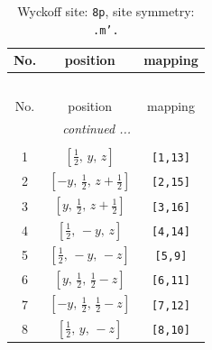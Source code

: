 \documentclass[fleqn,8pt]{jsarticle}
\begin{document}
\begin{longtable}{ccc}
\caption{Wyckoff site: {\tt 8p}, site symmetry: {\tt .m'.}}
 \\
 \hline \hline
No. & position & mapping \\ \hline \endfirsthead

\multicolumn{2}{l}{\tablename\ \thetable{}} \\
 \hline \hline
No. & position & mapping \\ \hline \endhead

 \hline \hline
\multicolumn{2}{r}{\footnotesize\it continued ...} \\ \endfoot

 \hline \hline
\multicolumn{2}{r}{} \\ \endlastfoot

1 & $\left[ \frac{1}{2},\, y,\, z \right]$ & {\tt [1,13]} \\ \hline
2 & $\left[ - y,\, \frac{1}{2},\, z + \frac{1}{2} \right]$ & {\tt [2,15]} \\ \hline
3 & $\left[ y,\, \frac{1}{2},\, z + \frac{1}{2} \right]$ & {\tt [3,16]} \\ \hline
4 & $\left[ \frac{1}{2},\, - y,\, z \right]$ & {\tt [4,14]} \\ \hline
5 & $\left[ \frac{1}{2},\, - y,\, - z \right]$ & {\tt [5,9]} \\ \hline
6 & $\left[ y,\, \frac{1}{2},\, \frac{1}{2} - z \right]$ & {\tt [6,11]} \\ \hline
7 & $\left[ - y,\, \frac{1}{2},\, \frac{1}{2} - z \right]$ & {\tt [7,12]} \\ \hline
8 & $\left[ \frac{1}{2},\, y,\, - z \right]$ & {\tt [8,10]} \\
\end{longtable}
\renewcommand{\arraystretch}{1.2}
\end{document}
